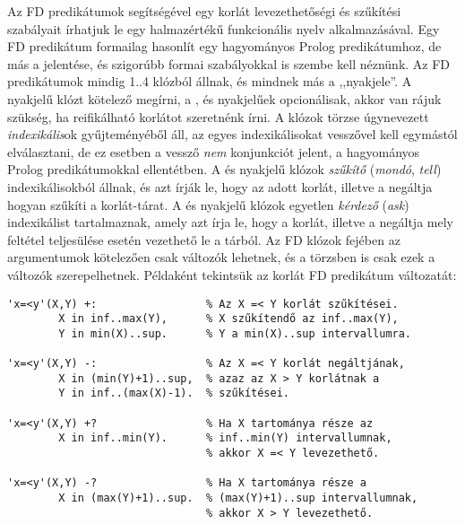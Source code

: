 Az FD predikátumok segítségével egy korlát levezethetőségi és szűkítési szabályait
írhatjuk le egy halmazértékű funkcionális nyelv alkalmazásával. Egy FD predikátum
formailag hasonlít egy hagyományos Prolog predikátumhoz, de más a jelentése, és
szigorúbb formai szabályokkal is szembe kell néznünk.
\br
Az FD predikátumok mindig 1..4 klózból állnak, és mindnek más a ,,nyakjele''. A
\cd{+:} nyakjelű klózt kötelező megírni, a \cd{-:},  és  nyakjelűek
opcionálisak, akkor van rájuk szükség, ha reifikálható korlátot szeretnénk írni.
A klózok törzse úgynevezett \emph{indexikális}ok gyűjteményéből áll, az egyes
indexikálisokat vesszővel kell egymástól elválasztani, de ez esetben a vessző
\emph{nem} konjunkciót jelent, a hagyományos Prolog predikátumokkal ellentétben.
A \cd{+:} és \cd{-:} nyakjelű klózok \emph{szűkítő} (\emph{mondó}, \emph{tell})
indexikálisokból állnak, és azt írják le, hogy az adott korlát, illetve a negáltja
hogyan szűkíti a korlát-tárat. A  és  nyakjelű klózok egyetlen
\emph{kérdező} (\emph{ask}) indexikálist tartalmaznak, amely azt írja le, hogy
a korlát, illetve a negáltja mely feltétel teljesülése esetén vezethető le a
tárból. Az FD klózok fejében az argumentumok kötelezően csak változók lehetnek,
és a törzsben is csak ezek a változók szerepelhetnek. Példaként tekintsük az
 korlát FD predikátum változatát:

\begin{verbatim}
'x=<y'(X,Y) +:                 % Az X =< Y korlát szűkítései.
        X in inf..max(Y),      % X szűkítendő az inf..max(Y),
        Y in min(X)..sup.      % Y a min(X)..sup intervallumra.

'x=<y'(X,Y) -:                 % Az X =< Y korlát negáltjának,
        X in (min(Y)+1)..sup,  % azaz az X > Y korlátnak a
        Y in inf..(max(X)-1).  % szűkítései.

'x=<y'(X,Y) +?                 % Ha X tartománya része az
        X in inf..min(Y).      % inf..min(Y) intervallumnak,
                               % akkor X =< Y levezethető.

'x=<y'(X,Y) -?                 % Ha X tartománya része a
        X in (max(Y)+1)..sup.  % (max(Y)+1)..sup intervallumnak,
                               % akkor X > Y levezethető.
\end{verbatim}

